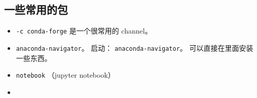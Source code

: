\subsection{一些常用的包}
\begin{itemize}
\item \verb`-c conda-forge` 是一个很常用的 channel。
\item \verb`anaconda-navigator`。 启动： \verb`anaconda-navigator`。 可以直接在里面安装一些东西。
\item \verb`notebook` （jupyter notebook）
\item 
\end{itemize}
